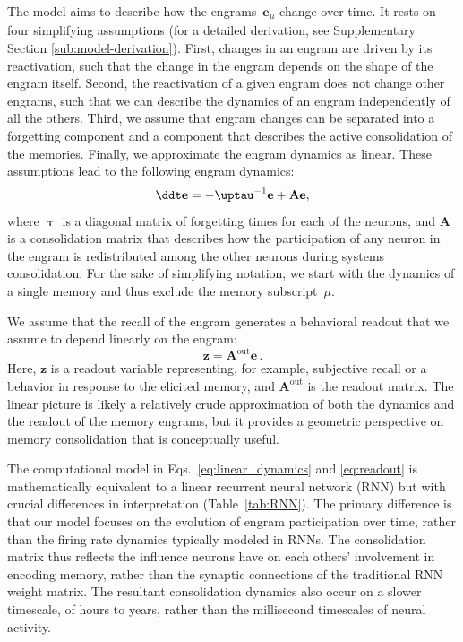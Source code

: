 The model aims to describe how the engrams~$\mathbf{e}_\mu$ change over time. It rests on four simplifying assumptions (for a detailed derivation, see Supplementary Section \ref{sub:model-derivation}). First, changes in an engram are driven by its reactivation, such that the change in the engram depends on the shape of the engram itself. Second, the reactivation of a given engram does not change other engrams, such that we can describe the dynamics of an engram independently of all the others. Third, we assume that engram changes can be separated into a forgetting component and a component that describes the active consolidation of the memories. Finally, we approximate the engram dynamics as linear. These assumptions lead to the following engram dynamics: 
\begin{equation}\label{eq:linear_dynamics}
  \ddt \mathbf{e} = -\boldsymbol{\uptau}^{-1} \mathbf{e} + \mathbf{A} \mathbf{e},
\end{equation}
where $\boldsymbol{\uptau}$ is a diagonal matrix of forgetting times for each of the neurons, and $\mathbf{A}$ is a consolidation matrix that describes how the participation of any neuron in the engram is redistributed among the other neurons during systems consolidation. For the sake of simplifying notation, we start with the dynamics of a single memory and thus exclude the memory subscript~$\mu$.

We assume that the recall of the engram generates a behavioral readout that we assume to depend linearly on the engram:
\begin{equation}\label{eq:readout}
  \mathbf{z} = \mathbf{A}^{\text{out}} \mathbf{e} \,.
\end{equation}
Here, $\mathbf{z}$ is a readout variable representing, for example, subjective recall or a behavior in response to the elicited memory, and $\mathbf{A}^{\text{out}}$ is the readout matrix. The linear picture is likely a relatively crude approximation of both the dynamics and the readout of the memory engrams, but it provides a geometric perspective on memory consolidation that is conceptually useful. 

The computational model in Eqs.~\eqref{eq:linear_dynamics} and \eqref{eq:readout} is mathematically equivalent to a linear recurrent neural network (RNN) but with crucial differences in interpretation (Table~\ref{tab:RNN}). The primary difference is that our model focuses on the evolution of engram participation over time, rather than the firing rate dynamics typically modeled in RNNs. The consolidation matrix thus reflects the influence neurons have on each others' involvement in encoding memory, rather than the synaptic connections of the traditional RNN weight matrix. The resultant consolidation dynamics also occur on a slower timescale, of hours to years, rather than the millisecond timescales of neural activity.

